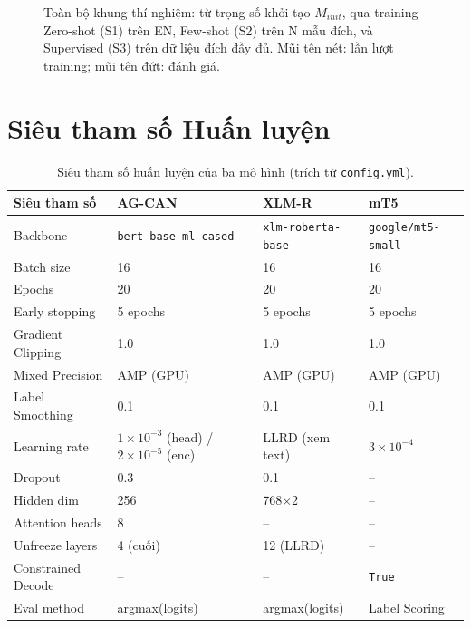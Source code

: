 \documentclass[12pt,a4paper,oneside]{report}
\begin{document}
\begin{figure}[ht]
{
}
\caption{Toàn bộ khung thí nghiệm: từ trọng số khởi tạo $M_{init}$, qua training Zero-shot (S1) trên EN, Few-shot (S2) trên N mẫu đích, và Supervised (S3) trên dữ liệu đích đầy đủ. Mũi tên nét: lần lượt training; mũi tên đứt: đánh giá.}
\label{fig:pipeline}
\end{figure}

\section{Siêu tham số Huấn luyện}

\begin{table}[ht]
\centering
\caption{Siêu tham số huấn luyện của ba mô hình (trích từ \texttt{config.yml}).}
\label{tab:hyperparams}
\begin{tabular}{@{}llll@{}}
\toprule
\textbf{Siêu tham số} & \textbf{AG-CAN} & \textbf{XLM-R} & \textbf{mT5} \\
\midrule
Backbone & \texttt{bert-base-ml-cased} & \texttt{xlm-roberta-base} & \texttt{google/mt5-small} \\
Batch size & 16 & 16 & 16 \\
Epochs & 20 & 20 & 20 \\
Early stopping & 5 epochs & 5 epochs & 5 epochs \\
Gradient Clipping & 1.0 & 1.0 & 1.0 \\
Mixed Precision & AMP (GPU) & AMP (GPU) & AMP (GPU) \\
Label Smoothing & 0.1 & 0.1 & 0.1 \\
Learning rate & $1\times10^{-3}$ (head) / $2\times10^{-5}$ (enc) & LLRD (xem text) & $3\times10^{-4}$ \\
Dropout & 0.3 & 0.1 & -- \\
Hidden dim & 256 & 768$\times$2 & -- \\
Attention heads & 8 & -- & -- \\
Unfreeze layers & 4 (cuối) & 12 (LLRD) & -- \\
Constrained Decode & -- & -- & \texttt{True} \\
Eval method & argmax(logits) & argmax(logits) & Label Scoring \\
\bottomrule
\end{tabular}
\end{table}
\end{document}
